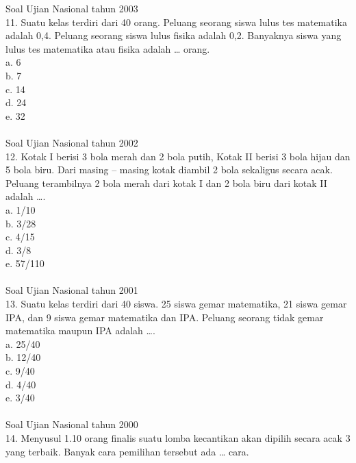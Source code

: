\documentclass[11pt,fleqn]{book} %
\begin{document}
Soal Ujian Nasional tahun 2003\\
11. Suatu kelas terdiri dari 40 orang. Peluang seorang siswa lulus tes matematika adalah 0,4. Peluang seorang siswa lulus fisika adalah 0,2. Banyaknya siswa yang lulus tes matematika atau fisika adalah … orang.\\

a. 6\\

b. 7\\

c. 14\\

d. 24\\

e. 32\\
\\

Soal Ujian Nasional tahun 2002\\
12. Kotak I berisi 3 bola merah dan 2 bola putih, Kotak II berisi 3 bola hijau dan 5 bola biru. Dari masing – masing kotak diambil 2 bola sekaligus secara acak. Peluang terambilnya 2 bola merah dari kotak I dan 2 bola biru dari kotak II adalah ….\\

a. 1/10\\

b. 3/28\\

c. 4/15\\

d. 3/8\\

e. 57/110\\
\\

Soal Ujian Nasional tahun 2001\\
13. Suatu kelas terdiri dari 40 siswa. 25 siswa gemar matematika, 21 siswa gemar IPA, dan 9 siswa gemar matematika dan IPA. Peluang seorang tidak gemar matematika maupun IPA adalah ….\\

a. 25/40\\

b. 12/40\\

c. 9/40\\

d. 4/40\\

e. 3/40\\
\\

Soal Ujian Nasional tahun 2000\\
14. Menyusul 1.10 orang finalis suatu lomba kecantikan akan dipilih secara acak 3 yang terbaik. Banyak cara pemilihan tersebut ada … cara.\\
\end{document}

